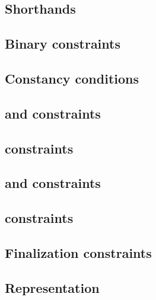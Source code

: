 \subsection{Shorthands}                                      \label{block data: generalities: shorthands}                            
\subsection{Binary constraints}                              \label{block data: generalities: binarities}                            
\subsection{Constancy                 conditions}            \label{block data: generalities: constancies}                           
\subsection{\locFlagSum{} and \iomf{} constraints}           \label{block data: generalities: flag sum and iomf constraints}         
\subsection{\relBlock{}               constraints}           \label{block data: generalities: rel block constraints}                 
\subsection{\ct{} and \maxCt{}        constraints}           \label{block data: generalities: ct and ct max constraints}             
\subsection{\instruction{}            constraints}           \label{block data: generalities: instruction constraints}               
\subsection{Finalization              constraints}           \label{block data: generalities: finalization}                          
\subsection{Representation}                                  \label{block data: generalities: representation}                        

